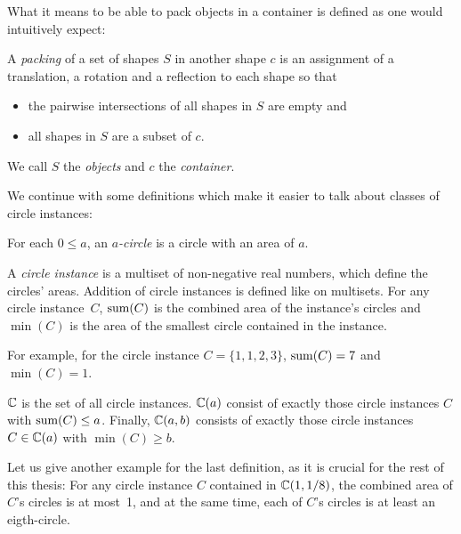 \documentclass[a4paper,style=print,oneside,bibliography=totoc,nexus,lnum,extramargin]{tubsbook}
\begin{document}
What it means to be able to pack objects in a container is defined as one would intuitively expect:

\begin{definition}
    A \emph{packing} of a set of shapes $S$ in another shape $c$ is an assignment of a translation, a rotation and a reflection to each shape so that

    \begin{itemize}
        \item the pairwise intersections of all shapes in $S$ are empty and
        \item all shapes in $S$ are a subset of $c$.
    \end{itemize}

    We call $S$ the \emph{objects} and $c$ the \emph{container}.
\end{definition}

We continue with some definitions which make it easier to talk about classes of circle instances:

\begin{definition}
    For each $0 \le a$, an \emph{$a$-circle} is a circle with an area of $a$.
\end{definition}

\begin{definition}\label{def:circle-instance}
    A \emph{circle instance} is a multiset of non-negative real numbers, which define the circles' areas. Addition of circle instances is defined like on multisets.
    For any circle instance~$C$, $\operatorname{sum}(C)$ is the combined area of the instance's circles and $\min(C)$ is the area of the smallest circle contained in the instance.
\end{definition}

For example, for the circle instance $C = \{1,1,2,3\}$, $\operatorname{sum}(C) = 7$ and $\min(C) = 1$.

\begin{definition}
    $\mathbb{C}$ is the set of all circle instances. $\mathbb{C}(a)$ consist of exactly those circle instances $C$ with $\operatorname{sum}(C) \le a$. Finally, $\mathbb{C}(a,b)$ consists of exactly those circle instances $C \in \mathbb{C}(a)$ with $\min(C) \ge b$.
\end{definition}

Let us give another example for the last definition, as it is crucial for the rest of this thesis: For any circle instance $C$ contained in $\mathbb{C}(1,1/8)$, the combined area of $C$'s circles is at most~1, and at the same time, each of $C$'s circles is at least an eigth-circle.
\end{document}
